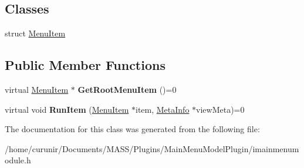 \subsection*{Classes}
\begin{DoxyCompactItemize}
\item 
struct \hyperlink{struct_i_main_menu_plugin_model_1_1_menu_item}{Menu\+Item}
\end{DoxyCompactItemize}
\subsection*{Public Member Functions}
\begin{DoxyCompactItemize}
\item 
virtual \hyperlink{struct_i_main_menu_plugin_model_1_1_menu_item}{Menu\+Item} $\ast$ {\bfseries Get\+Root\+Menu\+Item} ()=0\hypertarget{class_i_main_menu_plugin_model_a61477b16187bfdc4ef7c3ccd72d2c09d}{}\label{class_i_main_menu_plugin_model_a61477b16187bfdc4ef7c3ccd72d2c09d}

\item 
virtual void {\bfseries Run\+Item} (\hyperlink{struct_i_main_menu_plugin_model_1_1_menu_item}{Menu\+Item} $\ast$item, \hyperlink{struct_meta_info}{Meta\+Info} $\ast$view\+Meta)=0\hypertarget{class_i_main_menu_plugin_model_a45021f95c0dc5e75e938848d32053f92}{}\label{class_i_main_menu_plugin_model_a45021f95c0dc5e75e938848d32053f92}

\end{DoxyCompactItemize}


The documentation for this class was generated from the following file\+:\begin{DoxyCompactItemize}
\item 
/home/curunir/\+Documents/\+M\+A\+S\+S/\+Plugins/\+Main\+Menu\+Model\+Plugin/imainmenumodule.\+h\end{DoxyCompactItemize}
